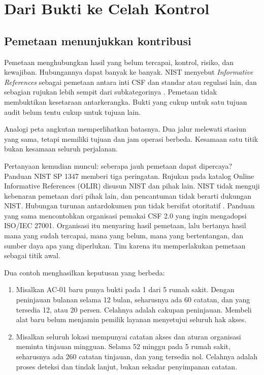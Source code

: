 \section{Dari Bukti ke Celah Kontrol}

\subsection*{Pemetaan menunjukkan kontribusi}

Pemetaan menghubungkan hasil yang belum tercapai, kontrol, risiko, dan kewajiban. Hubungannya dapat
banyak ke banyak. NIST menyebut \textit{Informative References} sebagai pemetaan antara inti CSF dan
standar atau regulasi lain, dan sebagian rujukan lebih sempit dari subkategorinya \cite{nistcsf2}.
Pemetaan tidak membuktikan kesetaraan antarkerangka. Bukti yang cukup untuk satu tujuan audit belum
tentu cukup untuk tujuan lain.

Analogi peta angkutan memperlihatkan batasnya. Dua jalur melewati stasiun yang sama, tetapi memiliki
tujuan dan jam operasi berbeda. Kesamaan satu titik bukan kesamaan seluruh perjalanan.

Pertanyaan kemudian muncul: seberapa jauh pemetaan dapat dipercaya? Panduan NIST SP 1347 memberi tiga
peringatan. Rujukan pada katalog Online Informative References (OLIR) disusun NIST dan pihak lain.
NIST tidak menguji kebenaran pemetaan dari pihak lain, dan pencantuman tidak berarti dukungan NIST.
Hubungan turunan antardokumen pun tidak bersifat otoritatif \cite{c06-nist-sp1347}. Panduan yang sama
mencontohkan organisasi pemakai CSF 2.0 yang ingin mengadopsi ISO/IEC 27001. Organisasi itu menyaring
hasil pemetaan, lalu bertanya hasil mana yang sudah tercapai, mana yang belum, mana yang bertentangan,
dan sumber daya apa yang diperlukan. Tim karena itu memperlakukan pemetaan sebagai titik awal.

Dua contoh menghasilkan keputusan yang berbeda:
\begin{enumerate}
  \item Misalkan AC-01 baru punya bukti pada 1 dari 5 rumah sakit. Dengan peninjauan bulanan selama
  12 bulan, seharusnya ada 60 catatan, dan yang tersedia 12, atau 20 persen. Celahnya adalah cakupan
  peninjauan. Membeli alat baru belum menjamin pemilik layanan menyetujui seluruh hak akses.
  \item Misalkan seluruh lokasi mempunyai catatan akses dan aturan organisasi meminta tinjauan
  mingguan. Selama 52 minggu pada 5 rumah sakit, seharusnya ada 260 catatan tinjauan, dan yang
  tersedia nol. Celahnya adalah proses deteksi dan tindak lanjut, bukan sekadar penyimpanan catatan.
\end{enumerate}

